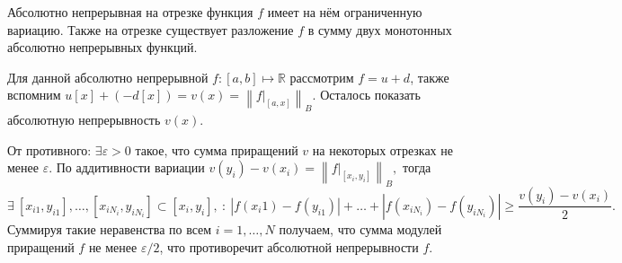 

\begin{to_lem}
    Абсолютно непрерывная на отрезке функция $f$ имеет на нём ограниченную вариацию. Также на отрезке существует разложение $f$ в сумму двух монотонных абсолютно непрерывных функций.
\end{to_lem}

\begin{uproof}
    Для данной абсолютно непрерывной $f \colon  [a, b] \mapsto \mathbb{R}$ рассмотрим $f = u + d$, также вспомним $u[x] + (-d[x]) = v(x) = \left\|f|_{[a, x]}\right\|_B$. Осталось показать абсолютную непрерывность $v(x)$.

    От противного: $\exists  \varepsilon > 0$ такое, что сумма приращений $v$ на некоторых отрезках не менее $\varepsilon$. По аддитивности вариации $v(y_i) - v(x_i) = \left\|f|_{[x_i, y_i]}\right\|_B,$ тогда
    \begin{equation*}
        \exists \ [x_{i1}, y_{i1}], \ldots, [x_{iN_i}, y_{iN_i}] \subset [x_i, y_i], \ \colon  \ |f(x_i1) - f(y_{i1})| + \ldots + |f(x_{i N_i}) - f(y_{iN_i})|
        \geq \frac{v(y_i) - v(x_i)}{2}.
    \end{equation*}
    Суммируя такие неравенства по всем $i = 1, \ldots, N$ получаем, что сумма модулей приращений $f$ не менее $\varepsilon/2$, что противоречит абсолютной непрерывности $f$. 
\end{uproof}



